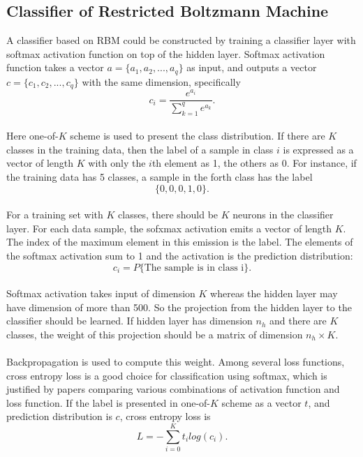\documentclass[12pt]{article}
\begin{document}
\subsection{Classifier of Restricted Boltzmann Machine}
A classifier based on RBM could be constructed by training a classifier layer with softmax activation function on top of the hidden layer. Softmax activation function takes a vector $a = \{a_1, a_2,..., a_q\}$ as input, and outputs a vector $c = \{c_1, c_2,..., c_q\}$ with the same dimension, specifically\begin{equation}
c_i = \frac{e^{a_i}}{\sum_{k=1}^q e^{a_k}}.
\end{equation}
\\
Here one-of-$K$ scheme is used to present the class distribution. If there are $K$ classes in the training data, then the label of a sample in class $i$ is expressed as a vector of length $K$ with only the $i$th element as 1, the others as 0. For instance, if the training data has 5 classes, a sample in the forth class has the label\begin{equation*}
\{0,0,0,1,0\}.
\end{equation*}
\\
For a training set with $K$ classes, there should be $K$ neurons in the classifier layer. For each data sample, the sofxmax activation emits a vector of length $K$. The index of the maximum element in this emission is the label. The elements of the  softmax activation sum to 1 and the activation is the prediction distribution:\begin{equation}
c_i = P\{\text{The sample is in class i}\}.
\end{equation}
\\
Softmax activation takes input of dimension $K$ whereas the hidden layer may have dimension of more than 500. So the projection from the hidden layer to the classifier should be learned. If hidden layer has dimension $n_h$ and there are $K$ classes, the weight of this projection should be a matrix of dimension $n_h\times K$.\\
\\
Backpropagation is used to compute this weight. Among several loss functions, cross entropy loss is a good choice for classification using softmax, which is justified by papers comparing various combinations of activation function and loss function. If the label is presented in one-of-$K$ scheme as a vector $t$, and prediction distribution is $c$,  cross entropy loss is \begin{equation}
L = -\sum_{i = 0}^K t_i log(c_i).
\end{equation}
\end{document}
